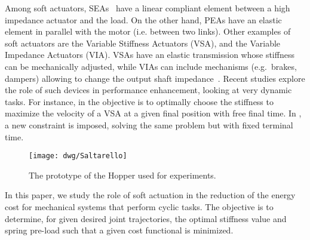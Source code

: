 Among soft actuators, SEAs~\cite{Pratt95} have a linear compliant element between a high impedance actuator and the load. On the other hand, PEAs have an elastic element in parallel with the motor (i.e. between two links). Other examples of soft actuators are the Variable Stiffness Actuators (VSA), and the Variable Impedance Actuators (VIA). VSAs have an elastic transmission whose stiffness can be mechanically adjusted, while VIAs can include mechanisms (e.g.~brakes, dampers) allowing to change the output shaft impedance~\cite{CGGBDBTB12:2}.
% 
Recent studies explore the role of such devices in performance enhancement, looking at very dynamic tasks. For instance, in \cite{AlbuSchaffer2011, Garabini2011} the objective is to optimally choose the stiffness to maximize the velocity of a VSA at a given final position with free final time. In \cite{CGGBDBTB12}, a new constraint is imposed, solving the same problem but with fixed terminal time.
 
\begin{figure}[t!]
\centering
\texttt{[image: dwg/Saltarello]}
\caption{The prototype of the Hopper used for experiments.}
\label{fig:Prototype}
\end{figure}
In this paper, we study the role of soft actuation in the reduction of the energy cost for mechanical systems that perform cyclic tasks. The objective is to determine, for given desired joint trajectories, the optimal stiffness value and spring pre-load such that a given cost functional is minimized.

